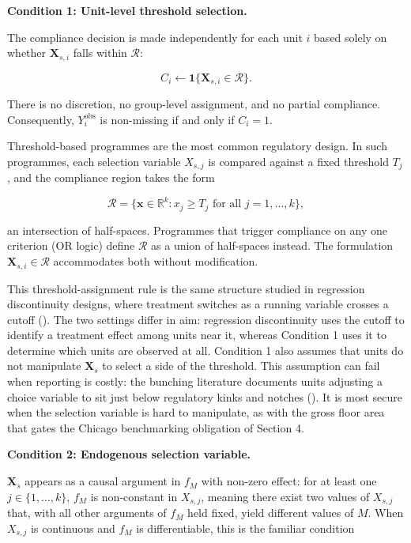 \textbf{Condition 1: Unit-level threshold selection.}

The compliance decision is made independently for each unit $i$ based solely on whether $\mathbf{X}_{s,i}$ falls within $\mathcal{R}$:

\[
C_i \leftarrow \mathbf{1}\{ \mathbf{X}_{s,i} \in \mathcal{R} \}.
\]

There is no discretion, no group-level assignment, and no partial compliance. Consequently, $Y_i^{\text{obs}}$ is non-missing if and only if $C_i = 1$.

Threshold-based programmes are the most common regulatory design. In such programmes, each selection variable $X_{s,j}$ is compared against a fixed threshold $T_j$, and the compliance region takes the form

\[
\mathcal{R} = \{ \mathbf{x} \in \mathbb{R}^k : x_j \geq T_j \text{ for all } j = 1, \ldots, k \},
\]

an intersection of half-spaces. Programmes that trigger compliance on any one criterion (OR logic) define $\mathcal{R}$ as a union of half-spaces instead. The formulation $\mathbf{X}_{s,i} \in \mathcal{R}$ accommodates both without modification.

This threshold-assignment rule is the same structure studied in regression discontinuity designs, where treatment switches as a running variable crosses a cutoff (). The two settings differ in aim: regression discontinuity uses the cutoff to identify a treatment effect among units near it, whereas Condition 1 uses it to determine which units are observed at all. Condition 1 also assumes that units do not manipulate $\mathbf{X}_s$ to select a side of the threshold. This assumption can fail when reporting is costly: the bunching literature documents units adjusting a choice variable to sit just below regulatory kinks and notches (). It is most secure when the selection variable is hard to manipulate, as with the gross floor area that gates the Chicago benchmarking obligation of Section 4.

\textbf{Condition 2: Endogenous selection variable.}

$\mathbf{X}_s$ appears as a causal argument in $f_M$ with non-zero effect: for at least one $j \in \{1, \ldots, k\}$, $f_M$ is non-constant in $X_{s,j}$, meaning there exist two values of $X_{s,j}$ that, with all other arguments of $f_M$ held fixed, yield different values of $M$. When $X_{s,j}$ is continuous and $f_M$ is differentiable, this is the familiar condition

